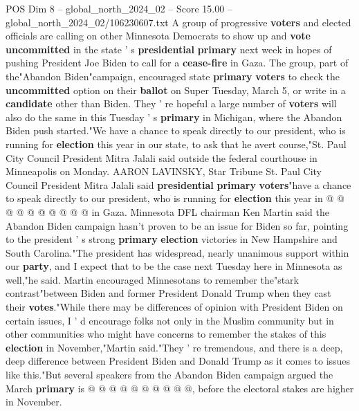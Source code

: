 \begin{textsample}{POS Dim 8 – global\_north\_2024\_02 – Score 15.00 – global\_north\_2024\_02/106230607.txt}  \label{ex:f8_pos_026}
A group of progressive \textbf{voters} and elected officials are calling on other Minnesota Democrats to show up and \textbf{vote} \textbf{uncommitted} in the state ' s \textbf{presidential} \textbf{primary} next week in hopes of pushing President Joe Biden to call for a \textbf{cease-fire} in Gaza.
The group, part of the"Abandon Biden"campaign, encouraged state \textbf{primary} \textbf{voters} to check the \textbf{uncommitted} option on their \textbf{ballot} on Super Tuesday, March 5, or write in a \textbf{candidate} other than Biden.
They ' re hopeful a large number of \textbf{voters} will also do the same in this Tuesday ' s \textbf{primary} in Michigan, where the Abandon Biden push started."We have a chance to speak directly to our president, who is running for \textbf{election} this year in our state, to ask that he avert course,"St.
Paul City Council President Mitra Jalali said outside the federal courthouse in Minneapolis on Monday.
AARON LAVINSKY, Star Tribune St.
Paul City Council President Mitra Jalali said \textbf{presidential} \textbf{primary} \textbf{voters}"have a chance to speak directly to our president, who is running for \textbf{election} this year in @ @ @ @ @ @ @ @ @ @ in Gaza.
Minnesota DFL chairman Ken Martin said the Abandon Biden campaign hasn't proven to be an issue for Biden so far, pointing to the president ' s strong \textbf{primary} \textbf{election} victories in New Hampshire and South Carolina."The president has widespread, nearly unanimous support within our \textbf{party}, and I expect that to be the case next Tuesday here in Minnesota as well,"he said.
Martin encouraged Minnesotans to remember the"stark contrast"between Biden and former President Donald Trump when they cast their \textbf{votes}."While there may be differences of opinion with President Biden on certain issues, I ' d encourage folks not only in the Muslim community but in other communities who might have concerns to remember the stakes of this \textbf{election} in November,"Martin said."They ' re tremendous, and there is a deep, deep difference between President Biden and Donald Trump as it comes to issues like this."But several speakers from the Abandon Biden campaign argued the March \textbf{primary} is @ @ @ @ @ @ @ @ @ @, before the electoral stakes are higher in November.

\end{textsample}
